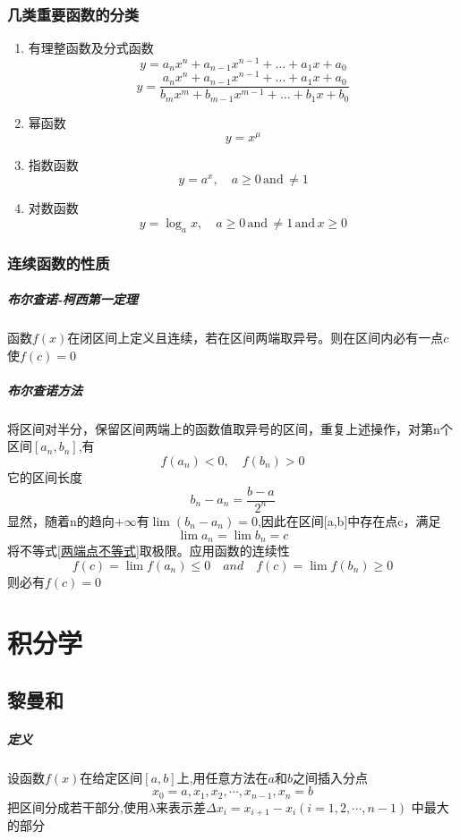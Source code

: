 \documentclass[12pt,a4paper]{report}
\begin{document}
\subsection{几类重要函数的分类}
\begin{enumerate}
    \item 有理整函数及分式函数
        $$y=a_nx^n+a_{n-1}x^{n-1}+\dots+a_1x+a_0$$
        $$y=\frac{a_nx^n+a_{n-1}x^{n-1}+\dots+a_1x+a_0}{b_mx^m+b_{m-1}x^{m-1}+\dots+b_1x+b_0}$$
    \item 幂函数$$y=x^{\mu}$$
    \item 指数函数$$y=a^x,\quad a\geqslant 0\,\mathrm{and}\,\neq 1$$
    \item 对数函数$$y=\log_a x,\quad a\geqslant 0\,\mathrm{and}\,\neq 1\,\mathrm{and}\,x\geqslant 0$$
\end{enumerate}

\subsection{连续函数的性质}
\paragraph{布尔查诺-柯西第一定理}
函数$f(x)$在闭区间上定义且连续，若在区间两端取异号。则在区间内必有一点$c$使$f(c)=0$
\paragraph{布尔查诺方法}
将区间对半分，保留区间两端上的函数值取异号的区间，重复上述操作，对第n个区间$[a_n,b_n]$,有
\begin{equation}
f(a_n)<0,\quad f(b_n)>0
\label{两端点不等式}
\end{equation}
它的区间长度
$$
b_n-a_n=\frac{b-a}{2^n}
$$
显然，随着n的趋向$+\infty$有$\lim (b_n-a_n) =0$,因此在区间[a,b]中存在点c，满足
$$
\lim a_n =\lim b_n =c
$$
将不等式\eqref{两端点不等式}取极限。应用函数的连续性
$$
f(c)=\lim f(a_n) \leqslant 0 \quad and \quad f(c)=\lim f(b_n) \geqslant 0
$$
则必有$f(c)=0$

\chapter{积分学}
\section{黎曼和}
\paragraph{定义}
设函数$f(x)$在给定区间$[a,b]$上,用任意方法在$a$和$b$之间插入分点
$$
x_0=a,x_1,x_2,\cdots,x_{n-1},x_n=b
$$
把区间分成若干部分,使用$\lambda$来表示差$\Delta x_i=x_{i+1}-x_i (i=1,2,\cdots,n-1)$
中最大的部分
\end{document}
